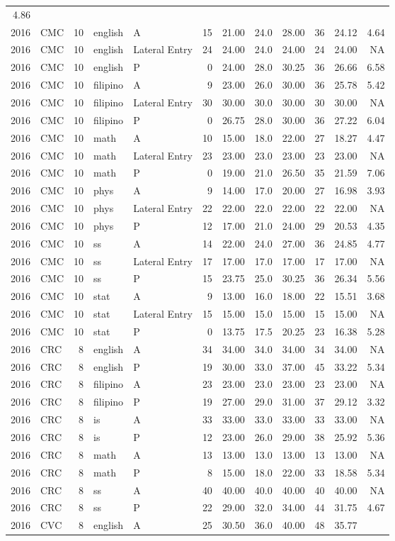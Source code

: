 \documentclass[]{article}
\begin{document}
\begin{longtable}[]{@{}rlrllrrrrrrr@{}}
4.86\tabularnewline
2016 & CMC & 10 & english & A & 15 & 21.00 & 24.0 & 28.00 & 36 & 24.12 &
4.64\tabularnewline
2016 & CMC & 10 & english & Lateral Entry & 24 & 24.00 & 24.0 & 24.00 &
24 & 24.00 & NA\tabularnewline
2016 & CMC & 10 & english & P & 0 & 24.00 & 28.0 & 30.25 & 36 & 26.66 &
6.58\tabularnewline
2016 & CMC & 10 & filipino & A & 9 & 23.00 & 26.0 & 30.00 & 36 & 25.78 &
5.42\tabularnewline
2016 & CMC & 10 & filipino & Lateral Entry & 30 & 30.00 & 30.0 & 30.00 &
30 & 30.00 & NA\tabularnewline
2016 & CMC & 10 & filipino & P & 0 & 26.75 & 28.0 & 30.00 & 36 & 27.22 &
6.04\tabularnewline
2016 & CMC & 10 & math & A & 10 & 15.00 & 18.0 & 22.00 & 27 & 18.27 &
4.47\tabularnewline
2016 & CMC & 10 & math & Lateral Entry & 23 & 23.00 & 23.0 & 23.00 & 23
& 23.00 & NA\tabularnewline
2016 & CMC & 10 & math & P & 0 & 19.00 & 21.0 & 26.50 & 35 & 21.59 &
7.06\tabularnewline
2016 & CMC & 10 & phys & A & 9 & 14.00 & 17.0 & 20.00 & 27 & 16.98 &
3.93\tabularnewline
2016 & CMC & 10 & phys & Lateral Entry & 22 & 22.00 & 22.0 & 22.00 & 22
& 22.00 & NA\tabularnewline
2016 & CMC & 10 & phys & P & 12 & 17.00 & 21.0 & 24.00 & 29 & 20.53 &
4.35\tabularnewline
2016 & CMC & 10 & ss & A & 14 & 22.00 & 24.0 & 27.00 & 36 & 24.85 &
4.77\tabularnewline
2016 & CMC & 10 & ss & Lateral Entry & 17 & 17.00 & 17.0 & 17.00 & 17 &
17.00 & NA\tabularnewline
2016 & CMC & 10 & ss & P & 15 & 23.75 & 25.0 & 30.25 & 36 & 26.34 &
5.56\tabularnewline
2016 & CMC & 10 & stat & A & 9 & 13.00 & 16.0 & 18.00 & 22 & 15.51 &
3.68\tabularnewline
2016 & CMC & 10 & stat & Lateral Entry & 15 & 15.00 & 15.0 & 15.00 & 15
& 15.00 & NA\tabularnewline
2016 & CMC & 10 & stat & P & 0 & 13.75 & 17.5 & 20.25 & 23 & 16.38 &
5.28\tabularnewline
2016 & CRC & 8 & english & A & 34 & 34.00 & 34.0 & 34.00 & 34 & 34.00 &
NA\tabularnewline
2016 & CRC & 8 & english & P & 19 & 30.00 & 33.0 & 37.00 & 45 & 33.22 &
5.34\tabularnewline
2016 & CRC & 8 & filipino & A & 23 & 23.00 & 23.0 & 23.00 & 23 & 23.00 &
NA\tabularnewline
2016 & CRC & 8 & filipino & P & 19 & 27.00 & 29.0 & 31.00 & 37 & 29.12 &
3.32\tabularnewline
2016 & CRC & 8 & is & A & 33 & 33.00 & 33.0 & 33.00 & 33 & 33.00 &
NA\tabularnewline
2016 & CRC & 8 & is & P & 12 & 23.00 & 26.0 & 29.00 & 38 & 25.92 &
5.36\tabularnewline
2016 & CRC & 8 & math & A & 13 & 13.00 & 13.0 & 13.00 & 13 & 13.00 &
NA\tabularnewline
2016 & CRC & 8 & math & P & 8 & 15.00 & 18.0 & 22.00 & 33 & 18.58 &
5.34\tabularnewline
2016 & CRC & 8 & ss & A & 40 & 40.00 & 40.0 & 40.00 & 40 & 40.00 &
NA\tabularnewline
2016 & CRC & 8 & ss & P & 22 & 29.00 & 32.0 & 34.00 & 44 & 31.75 &
4.67\tabularnewline
2016 & CVC & 8 & english & A & 25 & 30.50 & 36.0 & 40.00 & 48 & 35.77 &

\end{longtable}
\end{document}
